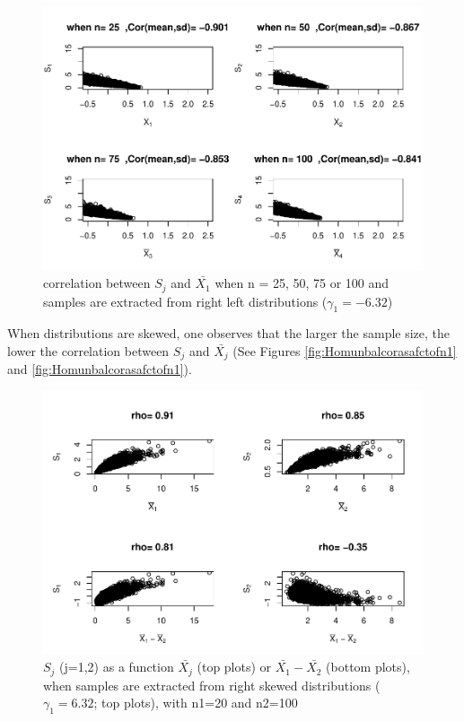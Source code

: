 \documentclass[
  man]{apa6}
\begin{document}
\begin{figure}
\centering
\includegraphics{Correlations-between-the-sample-means-difference-and-standardizers-of-all-estimators,-and-implications-on-biases-and-variances-of-all-estimators_files/figure-latex/Homunbalcorasafctofn2-1.pdf}
\caption{\label{fig:Homunbalcorasafctofn2}correlation between \(S_j\) and \(\bar{X_1}\) when n = 25, 50, 75 or 100 and samples are extracted from right left distributions (\(\gamma_1 = -6.32\))}
\end{figure}

When distributions are skewed, one observes that the larger the sample size, the lower the correlation between \(S_j\) and \(\bar{X_j}\) (See Figures \ref{fig:Homunbalcorasafctofn1} and \ref{fig:Homunbalcorasafctofn1}).

\begin{figure}
\centering
\includegraphics{Correlations-between-the-sample-means-difference-and-standardizers-of-all-estimators,-and-implications-on-biases-and-variances-of-all-estimators_files/figure-latex/pltSDHomunbalRskew-1.pdf}
\caption{\label{fig:pltSDHomunbalRskew}\(S_j\) (j=1,2) as a function \(\bar{X_j}\) (top plots) or \(\bar{X_1}-\bar{X_2}\) (bottom plots), when samples are extracted from right skewed distributions (\(\gamma_1 = 6.32\); top plots), with n1=20 and n2=100}
\end{figure}
\end{document}
